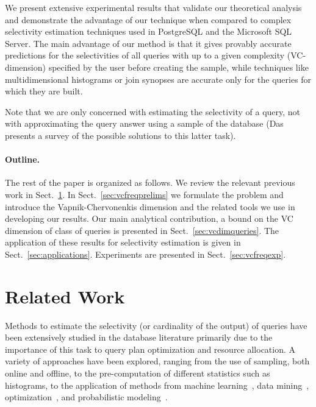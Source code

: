 We present extensive experimental results that validate our theoretical analysis
and demonstrate the advantage of our technique when compared to complex
selectivity estimation techniques used in PostgreSQL and the Microsoft SQL
Server. The main advantage of our method is that it gives provably accurate
predictions for the selectivities of all queries with up to a given complexity
(VC-dimension) specified by the user before creating the sample, while
techniques like multidimensional histograms or join synopses are accurate only
for the queries for which they are built.

Note that we are only concerned with estimating the selectivity of a query, not
with approximating the query answer using a sample of the database
(Das~\citeyearpar{Das09} presents a survey of the possible solutions to this latter
task). %

\paragraph{Outline.} The rest of the paper is organized as follows. We review
the relevant previous work in Sect.~\ref{sec:vcfreqprevwork}. In
Sect.~\ref{sec:vcfreqprelims} we formulate the problem and introduce the
Vapnik-Chervonenkis dimension and the related tools we use in developing our
results. Our main analytical contribution, a bound on the VC dimension  of class of queries is presented in Sect.~\ref{sec:vcdimqueries}.  The application of these results for selectivity estimation is
given in Sect.~\ref{sec:applications}. Experiments are presented in
Sect.~\ref{sec:vcfreqexp}. 

\section{Related Work}\label{sec:vcfreqprevwork}
Methods to estimate the selectivity (or cardinality of the output) of queries
have been extensively studied in the database literature primarily due to the
importance of this task  to query plan optimization and resource allocation. A
variety of approaches have been explored, ranging from the use of sampling, both
online and offline, to the pre-computation of different statistics such as
histograms, to the application of methods from machine
learning~\citep{ChenMM90,HarangsriNS97}, data mining~\citep{GryzL04},
optimization~\citep{ChaudhuriDN07,MarklHKMST07}, and probabilistic
modeling~\citep{GetoorTK01,ReS10}.

